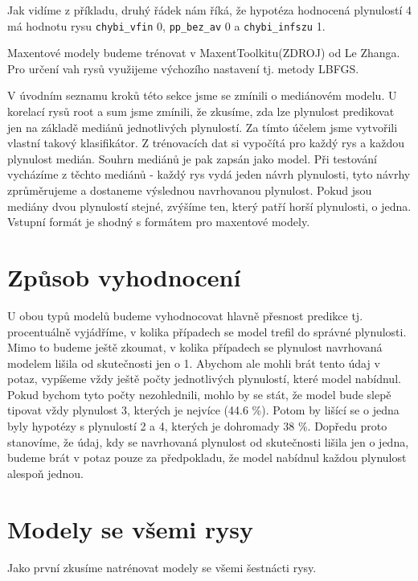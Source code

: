 \documentclass[12pt,a4paper]{report}
\begin{document}
Jak vidíme z příkladu, druhý řádek nám říká, že hypotéza hodnocená plynulostí 4 má hodnotu rysu \texttt{chybi\_vfin} 0, \texttt{pp\_bez\_av} 0 a \texttt{chybi\_infszu} 1.

Maxentové modely budeme trénovat v MaxentToolkitu(ZDROJ) od Le Zhanga. Pro určení vah rysů využijeme výchozího nastavení tj. metody LBFGS.

V úvodním seznamu kroků této sekce jsme se zmínili o mediánovém modelu. U korelací rysů root a sum jsme zmínili, že zkusíme, zda lze plynulost predikovat jen na základě mediánů jednotlivých plynulostí. Za tímto účelem jsme vytvořili vlastní takový klasifikátor. Z trénovacích dat si vypočítá pro každý rys a každou plynulost medián. Souhrn mediánů je pak zapsán jako model. Při testování vycházíme z těchto mediánů - každý rys vydá jeden návrh plynulosti, tyto návrhy zprůměrujeme a dostaneme výslednou navrhovanou plynulost. Pokud jsou mediány dvou plynulostí stejné, zvýšíme ten, který patří horší plynulosti, o jedna. Vstupní formát je shodný s formátem pro maxentové modely.

\section{Způsob vyhodnocení}
U obou typů modelů budeme vyhodnocovat hlavně přesnost predikce tj. procentuálně vyjádříme, v kolika případech se model trefil do správné plynulosti. Mimo to budeme ještě zkoumat, v kolika případech se plynulost navrhovaná modelem lišila od skutečnosti jen o 1. Abychom ale mohli brát tento údaj v potaz, vypíšeme vždy ještě počty jednotlivých plynulostí, které model nabídnul. Pokud bychom tyto počty nezohlednili, mohlo by se stát, že model bude slepě tipovat vždy plynulost 3, kterých je nejvíce (44.6 \%). Potom by lišící se o jedna byly hypotézy s plynulostí 2 a 4, kterých je dohromady 38 \%. Dopředu proto stanovíme, že údaj, kdy se navrhovaná plynulost od skutečnosti lišila jen o jedna, budeme brát v potaz pouze za předpokladu, že model nabídnul každou plynulost alespoň jednou. 


\section{Modely se všemi rysy}
Jako první zkusíme natrénovat modely se všemi šestnácti rysy.
\end{document}
